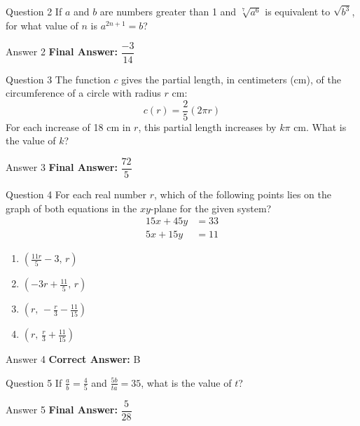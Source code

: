 \documentclass{beamer}
\begin{document}
\begin{frame}{Question 2}
\small
If \(a\) and \(b\) are numbers greater than 1 and \(\sqrt[7]{a^6}\) is equivalent to \(\sqrt{b^3}\), for what value of \(n\) is \(a^{2n+1} = b\)?
\end{frame}
\begin{frame}{Answer 2}
\small
\textbf{Final Answer:} $\boxed{\dfrac{-3}{14}}$
\end{frame}

\begin{frame}{Question 3}
\small
The function \(c\) gives the partial length, in centimeters (cm), of the circumference of a circle with radius \(r\) cm:
\[
c(r) = \frac{2}{5}(2\pi r)
\]
For each increase of 18 cm in \(r\), this partial length increases by \(k\pi\) cm.
What is the value of \(k\)?
\end{frame}
\begin{frame}{Answer 3}
\small
\textbf{Final Answer:} $\boxed{\dfrac{72}{5}}$
\end{frame}

\begin{frame}{Question 4}
\small
For each real number \(r\), which of the following points lies on the graph of both equations in the \(xy\)-plane for the given system?
\[
\begin{aligned}
15x + 45y &= 33 \\
5x + 15y &= 11
\end{aligned}
\]
\vspace{0.35cm}
\begin{enumerate}
    \item[A.] \(\left(\frac{11r}{5} - 3,\, r\right)\)
    \item[B.] \(\left(-3r + \frac{11}{5},\, r\right)\)
    \item[C.] \(\left(r,\, -\frac{r}{3} - \frac{11}{15}\right)\)
    \item[D.] \(\left(r,\, \frac{r}{3} + \frac{11}{15}\right)\)
\end{enumerate}
\end{frame}
\begin{frame}{Answer 4}
\small
\textbf{Correct Answer:} B
\end{frame}

\begin{frame}{Question 5}
\small
If \(\frac{a}{b} = \frac{4}{5}\) and \(\frac{5b}{ta} = 35\), what is the value of \(t\)?
\end{frame}
\begin{frame}{Answer 5}
\small
\textbf{Final Answer:} $\boxed{\dfrac{5}{28}}$
\end{frame}
\end{document}
